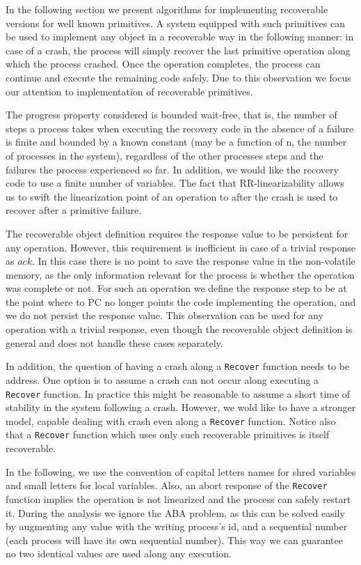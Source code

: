 In the following section we present algorithms for implementing recoverable versions for well known primitives. A system equipped with such primitives can be used to implement any object in a recoverable way in the following manner: in case of a crash, the process will simply recover the last primitive operation along which the process crashed. Once the operation completes, the process can continue and execute the remaining code safely. Due to this observation we focus our attention to implementation of recoverable primitives.

The progress property considered is bounded wait-free, that is, the number of steps a process takes when executing the recovery code in the absence of a failure is finite and bounded by a known constant (may be a function of n, the number of processes in the system), regardless of the other processes steps and the failures the process experienced so far. In addition, we would like the recovery code to use a finite number of variables.
The fact that RR-linearizability allows us to swift the linearization point of an operation to after the crash is used to recover after a primitive failure.

The recoverable object definition requires the response value to be persistent for any operation. However, this requirement is inefficient in case of a trivial response as $ack$. In this case there is no point to save the response value in the non-volatile memory, as the only information relevant for the process is whether the operation was complete or not. For such an operation we define the response step to be at the point where to PC no longer points the code implementing the operation, and we do not persist the response value. This observation can be used for any operation with a trivial response, even though the recoverable object definition is general and does not handle these cases separately.

In addition, the question of having a crash along a \texttt{Recover} function needs to be address. One option is to assume a crash can not occur along executing a \texttt{Recover} function. In practice this might be reasonable to assume a short time of stability in the system following a crash. However, we wold like to have a stronger model, capable dealing with crash even along a \texttt{Recover} function. Notice also that a \texttt{Recover} function which uses only such recoverable primitives is itself recoverable.

In the following, we use the convention of capital letters names for shred variables and small letters for local variables. Also, an abort response of the \texttt{Recover} function implies the operation is not linearized and the process can safely restart it. During the analysis we ignore the ABA problem, as this can be solved easily by augmenting any value with the writing process's id, and a sequential number (each process will have its own sequential number). This way we can guarantee no two identical values are used along any execution.

